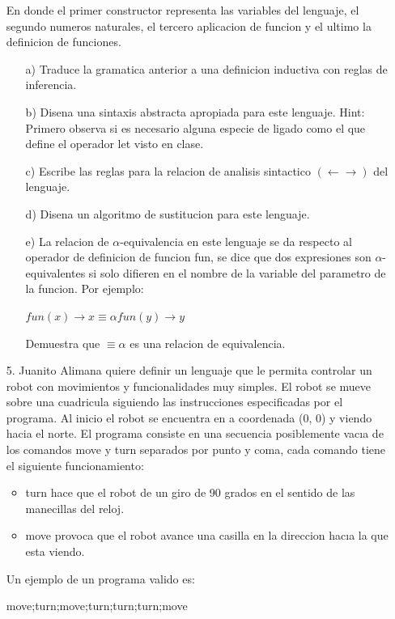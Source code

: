 \documentclass{article}
\begin{document}
\begin{itemize}
        En donde el primer constructor representa las variables del lenguaje, el segundo numeros naturales, el tercero aplicacion de funcion y el ultimo la definicion de funciones.
            \begin{itemize}
                \item[a)] Traduce la gramatica anterior a una definicion inductiva con reglas de inferencia.
                \item[b)] Disena una sintaxis abstracta apropiada para este lenguaje.
                Hint: Primero observa si es necesario alguna especie de ligado como el que define el operador let visto en clase.
                \item[c)] Escribe las reglas para la relacion de analisis sintactico $(\leftarrow\rightarrow)$ del lenguaje.
                \item[d)] Disena un algoritmo de sustitucion para este lenguaje.
                \item[e)] La relacion de $\alpha$-equivalencia en este lenguaje se da respecto al operador de definicion de funcion fun, se dice que dos expresiones son $\alpha$-equivalentes si solo difieren en el nombre de la variable del parametro de la funcion. Por ejemplo:
                \begin{center}
                    $fun (x) \rightarrow x \equiv\alpha fun (y) \rightarrow y$
                \end{center}
        Demuestra que $\equiv\alpha$ es una relacion de equivalencia.
            \end{itemize}
        \item[5.] Juanito Alimana quiere definir un lenguaje que le permita controlar un robot con movimientos y funcionalidades muy simples. El robot se mueve sobre una cuadricula siguiendo las instrucciones especificadas por el programa. Al inicio el robot se encuentra en a coordenada (0, 0) y viendo hacia el norte. El programa consiste en una secuencia posiblemente vacıa de los comandos move y turn separados por punto y coma, cada comando tiene el siguiente funcionamiento:
            \begin{itemize}
                \item turn hace que el robot de un giro de 90 grados en el sentido de las manecillas del reloj.
                \item move provoca que el robot avance una casilla en la direccion hacıa la que esta viendo.
            \end{itemize}
            Un ejemplo de un programa valido es:
            \begin{center}
                move;turn;move;turn;turn;turn;move
            \end{center}


\end{itemize}
\end{document}
